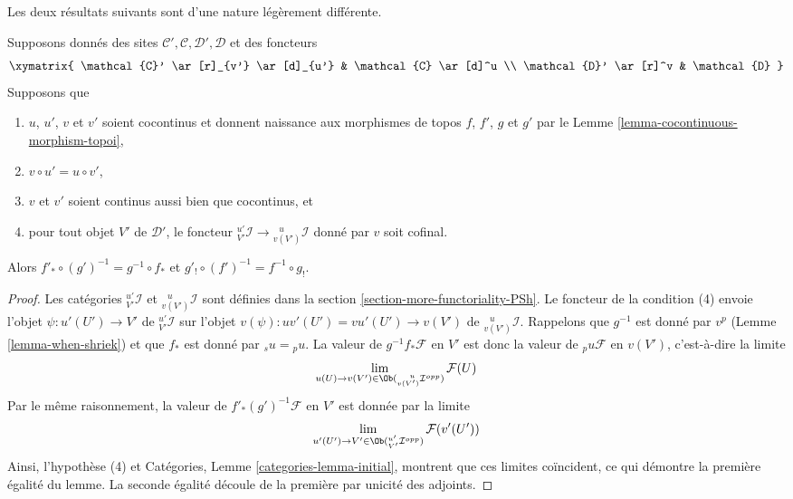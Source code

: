 \noindent
Les deux résultats suivants sont d’une nature légèrement différente.

\begin{lemma}
\label{lemma-special-square-cocontinuous}
Supposons donnés des sites $\mathcal{C}', \mathcal{C}, \mathcal{D}', \mathcal{D}$
et des foncteurs
$$
\xymatrix{
\mathcal{C}' \ar[r]_{v'} \ar[d]_{u'} &
\mathcal{C} \ar[d]^u \\
\mathcal{D}' \ar[r]^v &
\mathcal{D}
}
$$
Supposons que
\begin{enumerate}
\item $u$, $u'$, $v$ et $v'$ soient cocontinus et donnent naissance aux morphismes de
topos $f$, $f'$, $g$ et $g'$ par le Lemme \ref{lemma-cocontinuous-morphism-topoi},
\item $v \circ u' = u \circ v'$,
\item $v$ et $v'$ soient continus aussi bien que cocontinus, et
\item pour tout objet $V'$ de $\mathcal{D}'$, le foncteur
${}^{u'}_{V'}\mathcal{I} \to {}^{\ \ \ u}_{v(V')}\mathcal{I}$
donné par $v$ soit cofinal.
\end{enumerate}
Alors $f'_* \circ (g')^{-1} = g^{-1} \circ f_*$ et
$g'_! \circ (f')^{-1} = f^{-1} \circ g_!$.
\end{lemma}

\begin{proof}
Les catégories ${}^{u'}_{V'}\mathcal{I}$ et
${}^{\ \ \ u}_{v(V')}\mathcal{I}$ sont définies dans la
section \ref{section-more-functoriality-PSh}.
Le foncteur de la condition (4) envoie l’objet
$\psi : u'(U') \to V'$ de ${}^{u'}_{V'}\mathcal{I}$ sur l’objet
$v(\psi) : uv'(U') = vu'(U') \to v(V')$ de ${}^{\ \ \ u}_{v(V')}\mathcal{I}$.
Rappelons que $g^{-1}$ est donné par $v^p$ (Lemme \ref{lemma-when-shriek}) et
que $f_*$ est donné par ${}_su = {}_pu$. La valeur de
$g^{-1}f_*\mathcal{F}$ en $V'$ est donc la valeur de ${}_pu\mathcal{F}$
en $v(V')$, c’est-à-dire la limite
$$
\lim_{u(U) \to v(V') \in \Ob({}^{\ \ \ u}_{v(V')}\mathcal{I}^{opp})}
\mathcal{F}(U)
$$
Par le même raisonnement, la valeur de $f'_*(g')^{-1}\mathcal{F}$
en $V'$ est donnée par la limite
$$
\lim_{u'(U') \to V' \in \Ob({}^{u'}_{V'}\mathcal{I}^{opp})} \mathcal{F}(v'(U'))
$$
Ainsi, l’hypothèse (4) et Catégories, Lemme \ref{categories-lemma-initial},
montrent que ces limites coïncident, ce qui démontre la première égalité du
lemme. La seconde égalité découle de la première par unicité des
adjoints.
\end{proof}

